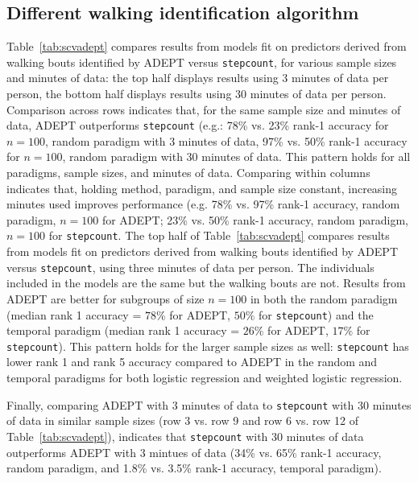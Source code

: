 \subsection{Different walking identification algorithm}

Table~\ref{tab:scvadept} compares results from models fit on predictors derived from walking bouts identified by ADEPT versus \texttt{stepcount}, for various sample sizes and minutes of data: the top half displays results using 3 minutes of data per person, the bottom half displays results using 30 minutes of data per person. Comparison across rows indicates that, for the same sample size and minutes of data, ADEPT outperforms \texttt{stepcount} (e.g.: 78\% vs. 23\% rank-1 accuracy for $n=100$, random paradigm with 3 minutes of data, 97\% vs. 50\% rank-1 accuracy for $n=100$, random paradigm with 30 minutes of data. This pattern holds for all paradigms, sample sizes, and minutes of data. Comparing within columns indicates that, holding method, paradigm, and sample size constant, increasing minutes used improves performance (e.g. 78\% vs. 97\% rank-1 accuracy, random paradigm, $n=100$ for ADEPT; 23\% vs. 50\% rank-1 accuracy, random paradigm, $n=100$ for \texttt{stepcount}. 
The top half of Table~\ref{tab:scvadept} compares results from models fit on predictors derived from walking bouts identified by ADEPT versus \texttt{stepcount}, using three minutes of data per person. The individuals included in the models are the same but the walking bouts are not. Results from ADEPT are better for subgroups of size $n = 100$ in both the random paradigm (median rank 1 accuracy = $78$\% for ADEPT, $50$\% for \texttt{stepcount}) and the temporal paradigm (median rank 1 accuracy = $26$\% for ADEPT, $17$\% for \texttt{stepcount}). This pattern holds for the larger sample sizes as well: \texttt{stepcount} has lower rank 1 and rank 5 accuracy compared to ADEPT in the random and temporal paradigms for both logistic regression and weighted logistic regression.

Finally, comparing ADEPT with 3 minutes of data to \texttt{stepcount} with 30 minutes of data in similar sample sizes (row 3 vs. row 9 and row 6 vs. row 12 of Table~\ref{tab:scvadept}), indicates that \texttt{stepcount} with 30 minutes of data outperforms ADEPT with 3 mintues of data (34\% vs. 65\% rank-1 accuracy, random paradigm, and 1.8\% vs. 3.5\% rank-1 accuracy, temporal paradigm).

